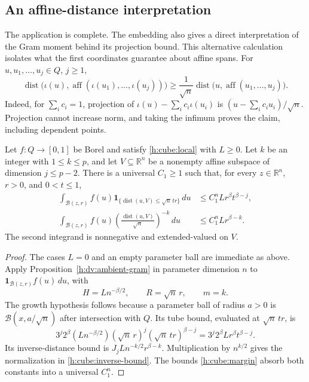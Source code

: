\subsection{An affine-distance interpretation}

The application is complete.  The embedding also gives a direct
interpretation of the Gram moment behind its projection bound.  This
alternative calculation isolates what the first coordinates guarantee
about affine spans.  For \(u,u_1,\ldots,u_j\in Q\), \(j\ge1\),
\begin{equation}\label{h:cube:affine}
 \operatorname{dist}\bigl(\iota(u),
       \operatorname{aff}(\iota(u_1),\ldots,\iota(u_j))\bigr)
 \ge\frac1{\sqrt n}
       \operatorname{dist}\bigl(u,\operatorname{aff}(u_1,\ldots,u_j)\bigr).
\end{equation}
Indeed, for \(\sum_i c_i=1\), projection of
\(\iota(u)-\sum_i c_i\iota(u_i)\) is
\((u-\sum_i c_i u_i)/\sqrt n\).  Projection cannot increase norm,
and taking the infimum proves the claim, including dependent points.

\begin{lemma}\label{h:cube:inverse}
Let \(f:Q\to[0,1]\) be Borel and satisfy \eqref{h:cube:local} with
\(L\ge0\).  Let \(k\) be an integer with \(1\le k\le p\), and let
\(V\subseteq\mathbb R^n\) be a nonempty affine subspace of dimension
\(j\le p-2\).  There is a universal \(C_1\ge1\) such that, for every
\(z\in\mathbb R^n\), \(r>0\), and \(0<t\le1\),
\begin{align}
 \int_{\mathcal B(z,r)}f(u)
   \mathbf1_{\{\operatorname{dist}(u,V)\le\sqrt n\,tr\}}\,du
 &\le C_1^n Lr^\beta t^{\beta-j},
 \label{h:cube:tube}\\
 \int_{\mathcal B(z,r)}f(u)
   \left(\frac{\operatorname{dist}(u,V)}{\sqrt n}\right)^{-k}\,du
 &\le C_1^n Lr^{\beta-k}.
 \label{h:cube:inverse-bound}
\end{align}
The second integrand is nonnegative and extended-valued on \(V\).
\end{lemma}

\begin{proof}
The cases \(L=0\) and an empty parameter ball are immediate as above.
Apply Proposition~\ref{h:dv:ambient-gram} in parameter dimension
\(n\) to
\(\mathbf1_{\mathcal B(z,r)}f(u)\,du\), with
\[
 H=Ln^{-\beta/2},\qquad R=\sqrt n\,r,\qquad m=k.
\]
The growth hypothesis follows because a parameter ball of radius
\(a>0\) is \(\mathcal B(x,a/\sqrt n)\) after intersection with
\(Q\).  Its tube bound, evaluated at \(\sqrt n\,tr\), is
\[
 3^j2^\beta (Ln^{-\beta/2})(\sqrt n\,r)^j
                 (\sqrt n\,tr)^{\beta-j}
 =3^j2^\beta Lr^\beta t^{\beta-j}.
\]
Its inverse-distance bound is
\(J_jLn^{-k/2}r^{\beta-k}\).  Multiplication by \(n^{k/2}\)
gives the normalization in \eqref{h:cube:inverse-bound}.
The bounds \eqref{h:cube:margin} absorb both constants into a universal
\(C_1^n\).
\end{proof}


